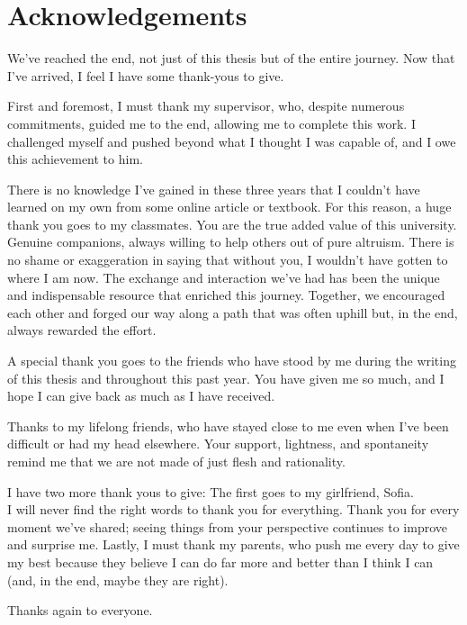 \chapter*{Acknowledgements}
We’ve reached the end, not just of this thesis but of the entire journey.
Now that I've arrived, I feel I have some thank-yous to give.

First and foremost, I must thank my supervisor, who, despite numerous commitments, guided me to the end, allowing me to complete this work. I challenged myself and pushed beyond what I thought I was capable of, and I owe this achievement to him.

There is no knowledge I’ve gained in these three years that I couldn’t have learned on my own from some online article or textbook. For this reason, a huge thank you goes to my classmates. You are the true added value of this university. Genuine companions, always willing to help others out of pure altruism.
There is no shame or exaggeration in saying that without you, I wouldn’t have gotten to where I am now. The exchange and interaction we’ve had has been the unique and indispensable resource that enriched this journey. Together, we encouraged each other and forged our way along a path that was often uphill but, in the end, always rewarded the effort.

A special thank you goes to the friends who have stood by me during the writing of this thesis and throughout this past year. You have given me so much, and I hope I can give back as much as I have received.

Thanks to my lifelong friends, who have stayed close to me even when I’ve been difficult or had my head elsewhere. Your support, lightness, and spontaneity remind me that we are not made of just flesh and rationality.

I have two more thank yous to give: The first goes to my girlfriend, Sofia. \\I will never find the right words to thank you for everything. Thank you for every moment we’ve shared; seeing things from your perspective continues to improve and surprise me.
Lastly, I must thank my parents, who push me every day to give my best because they believe I can do far more and better than I think I can (and, in the end, maybe they are right).

Thanks again to everyone.

